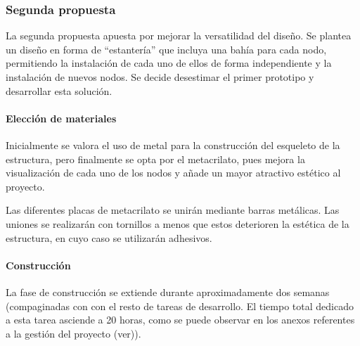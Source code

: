 \subsubsection{Segunda propuesta}

La segunda propuesta apuesta por mejorar la versatilidad del diseño. Se plantea un diseño en forma de ``estantería'' que incluya una bahía para cada nodo, permitiendo la instalación de cada uno de ellos de forma independiente y la instalación de nuevos nodos. Se decide desestimar el primer prototipo y desarrollar esta solución.

\paragraph{Elección de materiales\\}

Inicialmente se valora el uso de metal para la construcción del esqueleto de la estructura, pero finalmente se opta por el metacrilato, pues mejora la visualización de cada uno de los nodos y añade un mayor atractivo estético al proyecto.

Las diferentes placas de metacrilato se unirán mediante barras metálicas. Las uniones se realizarán con tornillos a menos que estos deterioren la estética de la estructura, en cuyo caso se utilizarán adhesivos.

\paragraph{Construcción\\}

La fase de construcción se extiende durante aproximadamente dos semanas (compaginadas con con el resto de tareas de desarrollo. El tiempo total dedicado a esta tarea asciende a 20 horas, como se puede observar en los anexos referentes a la gestión del proyecto (ver\citationneeded[TODO])).

